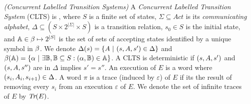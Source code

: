 \begin{definition}
	\label{def:CLTS} \emph{(Concurrent Labelled Transition Systems)} 
	A \emph{Concurrent Labelled Transition System} (CLTS) is \cltsDef, where $S$ is a finite set of states, $\Sigma \subseteq Act$ is its {\em communicating alphabet}, $\Delta \subseteq (S \times 2^{|\Sigma|} \times S)$ is a transition relation, $s_0 \in S$ is the initial state, and $\mathbb{A} \in \beta\mapsto 2^{|S|}$ is the set of sets of accepting states identified by a unique symbol in $\beta$.  We denote $\Delta(s)=\{A~|~(s,A,s') \in \Delta\}$ and $\beta(\mathbb{A})=\{\alpha~|~\exists\mathbb{B},\mathbb{B} \subseteq S:(\alpha,\mathbb{B})\in \mathbb{A} \}$. 
	A CLTS is deterministic if $(s,A,s')$ and $(s,A,s'')$ are in $\Delta$ implies $s'=s''$.
	An execution of $E$ is a word \executionDef where $(s_i, A_i, s_{i+1}) \in \Delta$. 
	A word $\pi$ is a trace (induced by $\varepsilon$) of $E$ if its the result of removing every $s_i$ from an execution $\varepsilon$ of $E$. 
	We denote the set of infinite traces of $E$ by $\emph{Tr}(E)$. 
\end{definition}